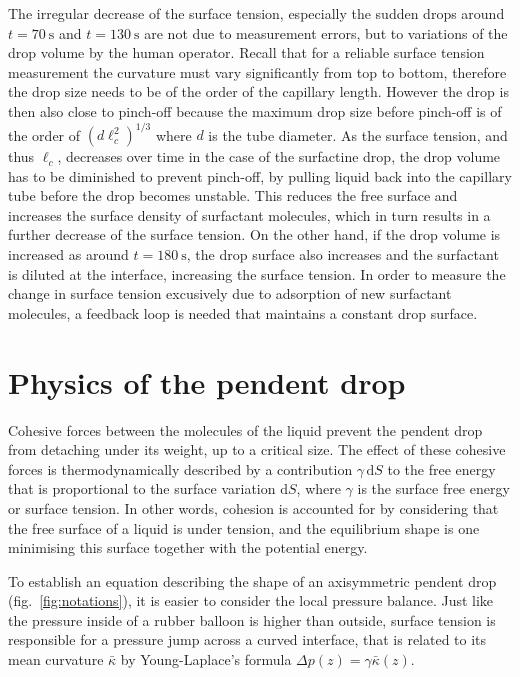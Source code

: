 \documentclass[fleqn]{scrartcl}
\newcommand{\ud}{\mathrm{d}}%
\begin{document}
The irregular decrease of the surface tension, especially the sudden
drops around $t=\SI{70}{\second}$ and $t=\SI{130}{\second}$ are not
due to measurement errors, but to variations of the drop volume by the
human operator. Recall that for a reliable surface tension measurement
the curvature must vary significantly from top to bottom, therefore
the drop size needs to be of the order of the capillary length.
However the drop is then also close to pinch-off because the maximum
drop size before pinch-off is of the order of $(d\ell_c^2)^{1/3}$
where $d$ is the tube diameter. As the surface tension, and thus
$\ell_c$, decreases over time in the case of the surfactine drop, the
drop volume has to be diminished to prevent pinch-off, by pulling
liquid back into the capillary tube before the drop becomes unstable.
This reduces the free surface and increases the surface density of
surfactant molecules, which in turn results in a further decrease of
the surface tension. On the other hand, if the drop volume is
increased as around $t=\SI{180}{\second}$, the drop surface also
increases and the surfactant is diluted at the interface, increasing
the surface tension. In order to measure the change in surface tension
excusively due to adsorption of new surfactant molecules, a feedback
loop is needed that maintains a constant drop surface.


\section{Physics of the pendent drop}
\label{sec:theory}

Cohesive forces between the molecules of the liquid prevent the
pendent drop from detaching under its weight, up to a critical size.
The effect of these cohesive forces is thermodynamically described by
a contribution $\gamma\, \ud S$ to the free energy that is
proportional to the surface variation $\ud S$, where $\gamma$ is the
surface free energy or surface tension. In other words, cohesion is
accounted for by considering that the free surface of a liquid is
under tension, and the equilibrium shape is one minimising this
surface together with the potential energy.

To establish an equation describing the shape of an axisymmetric
pendent drop (fig.~\ref{fig:notations}), it is easier to consider the
local pressure balance. Just like the pressure inside of a rubber
balloon is higher than outside, surface tension is responsible for a
pressure jump across a curved interface, that is related to its mean
curvature $\bar\kappa$ by Young-Laplace's formula $\Delta\! p(z) =
\gamma \bar\kappa(z)$.
\end{document}

